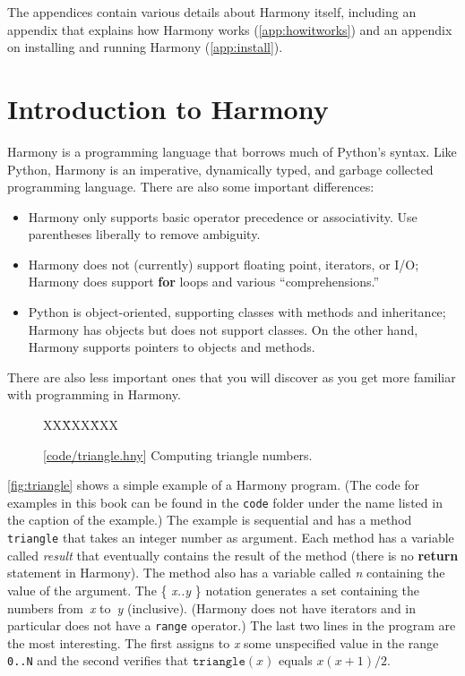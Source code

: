 \documentclass{report}
\newcommand{\harmonysource}[1]{
\begin{tabbing}
XX\=XXX\=XXX\kill
    
\end{tabbing}
}
\newcommand{\harmonylink}[1]{%
[\href{https://harmony.cs.cornell.edu/#1}{\underline{#1}}]%
}
\newenvironment{code}{
\tcolorbox
}{
\endtcolorbox
}
\begin{document}
The appendices contain various details about Harmony itself, including
an appendix that explains how Harmony works (\autoref{app:howitworks}) and
an appendix on installing and running Harmony (\autoref{app:install}).

\chapter{Introduction to Harmony}
\label{ch:harmonyintro}

Harmony is a programming language that borrows much of
Python's syntax.
Like Python, Harmony is an imperative,
dynamically typed, and garbage collected programming language.
There are also some important differences:
\begin{itemize}
\item Harmony only supports basic operator precedence or associativity.
Use parentheses liberally to remove ambiguity.
\item Harmony does not (currently) support floating point, iterators, or I/O;
Harmony does support \textbf{for} loops and various ``comprehensions.''
\item Python is object-oriented, supporting classes with methods and
inheritance; Harmony has objects but does not support classes.
On the other hand, Harmony supports pointers to objects and methods.
\end{itemize}
There are also less important ones that you will discover as
you get more familiar with programming in Harmony.

\begin{figure}
\begin{code}
\harmonysource{triangle}
\end{code}
\caption{\harmonylink{code/triangle.hny} Computing triangle numbers.}
\label{fig:triangle}
\end{figure}

\autoref{fig:triangle} shows a simple example of a Harmony program.
(The code for examples in this book can be found in the \texttt{code} folder under
the name listed in the caption of the example.)
The example is sequential and has a method \texttt{triangle} that takes
an integer number as argument.  Each method has a variable called
\textit{result} that eventually contains the result of the
method (there is no \textbf{return} statement in Harmony).  The method
also has a variable called \textit{n} containing the value of the
argument.  The \{ \textit{x..y} \} notation generates a set containing the numbers
from~\textit{x} to~\textit{y} (inclusive).
(Harmony does not have iterators and in particular does
not have a \texttt{range} operator.)
The last two lines in the program are
the most interesting.
The first assigns to \textit{x} some unspecified value in the range \texttt{0..N}
and the second verifies that $\mathtt{triangle}(x)$ equals $x(x+1)/2$.
\end{document}
